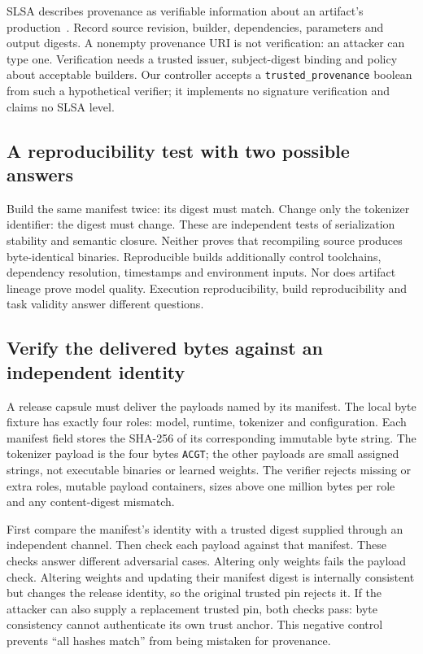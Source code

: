 
SLSA describes provenance as verifiable information about an artifact's
production~\cite{slsa44}. Record source revision, builder, dependencies,
parameters and output digests. A nonempty provenance URI is not verification:
an attacker can type one. Verification needs a trusted issuer, subject-digest
binding and policy about acceptable builders. Our controller accepts a
\texttt{trusted\_provenance} boolean from such a hypothetical verifier;
it implements no signature verification and claims no SLSA level.

\subsection{A reproducibility test with two possible answers}
Build the same manifest twice: its digest must match. Change only the
tokenizer identifier: the digest must change. These are independent tests of
serialization stability and semantic closure. Neither proves that recompiling
source produces byte-identical binaries. Reproducible builds additionally
control toolchains, dependency resolution, timestamps and environment inputs.
Nor does artifact lineage prove model quality. Execution reproducibility,
build reproducibility and task validity answer different questions.

\subsection{Verify the delivered bytes against an independent identity}
A release capsule must deliver the payloads named by its manifest. The local
byte fixture has exactly four roles: model, runtime, tokenizer and configuration.
Each manifest field stores the SHA-256 of its corresponding immutable byte
string. The tokenizer payload is the four bytes \texttt{ACGT}; the other
payloads are small assigned strings, not executable binaries or learned weights.
The verifier rejects missing or extra roles, mutable payload containers, sizes
above one million bytes per role and any content-digest mismatch.

First compare the manifest's identity with a trusted digest supplied through
an independent channel. Then check each payload against that manifest. These
checks answer different adversarial cases. Altering only weights fails the
payload check. Altering weights and updating their manifest digest is internally
consistent but changes the release identity, so the original trusted pin
rejects it. If the attacker can also supply a replacement trusted pin, both
checks pass: byte consistency cannot authenticate its own trust anchor. This
negative control prevents ``all hashes match'' from being mistaken for provenance.

